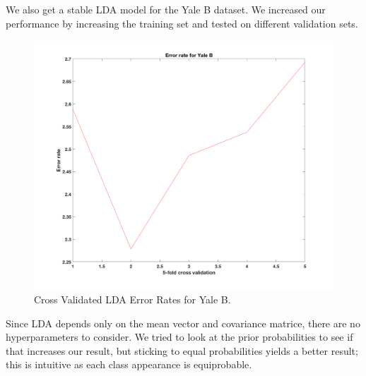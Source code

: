 We also get a stable LDA model for the Yale B dataset. We increased our performance by increasing the training set and tested on different validation sets. 
%
\begin{figure}[H]
	\centering\includegraphics[width=0.6\columnwidth]{../images/cr-err-yale}
	\caption{Cross Validated LDA Error Rates for Yale B.}
\end{figure}

Since LDA depends only on the mean vector and covariance matrice, there are no hyperparameters to consider. We tried to look at the prior probabilities to see if that increases our result, but sticking to equal probabilities yields a better result; this is intuitive as each class appearance is equiprobable. 